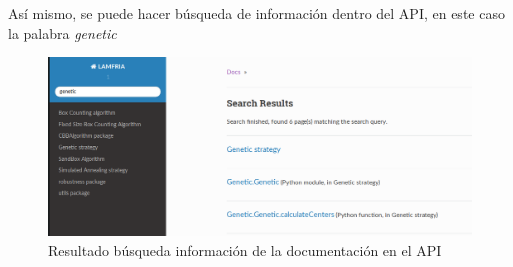 Así mismo, se puede hacer búsqueda de información dentro del API, en este caso la palabra \textit{genetic}

\begin{figure}[H]
    \centering
    \includegraphics[scale=0.45]{Capitulo7Libreria/imagenes/lamfriaC.png}
    \caption{Resultado búsqueda información de la documentación en el API}
    \label{fig:lamfriaC}
\end{figure}